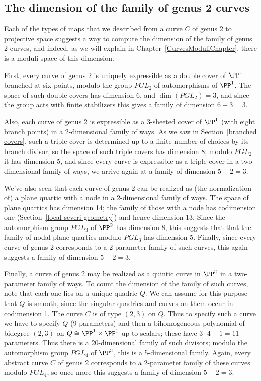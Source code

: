 \subsection{The dimension of the family of genus 2 curves}

Each of the types of maps that we described from a curve $C$ of genus 2 to projective space suggests
a way to compute the dimension of the family of genus 2 curves, and indeed, as we will explain in Chapter~\ref{CurvesModuliChapter}, there is a moduli space of this dimension.

First,  every curve of genus 2 is uniquely expressible as a double cover of $\PP^1$ branched at six points, modulo the group $PGL_2$ of automorphisms of $\PP^1$. The space of such double covers has dimension 6, and $\dim(PGL_2) = 3$, and since the group acts with finite stabilizers this gives a family of dimension $6-3 = 3$.

Also, each curve  of genus 2 is expressible as a 3-sheeted cover of $\PP^1$ (with eight branch points) in a 2-dimensional family of ways. As we saw in Section~\ref{branched covers}, such a triple cover is determined up to a finite number of choices by its branch divisor, so the space of such triple covers has dimension 8; modulo $PGL_2$ it has dimension 5, and since every curve is expressible as a triple cover in a two-dimensional family of ways, we arrive again at a family of dimension $ 5-2 = 3$.

We've also seen that each curve of genus 2 can be realized as (the normalization of) a plane quartic  with a node in a 2-dimensional family of ways. The space of plane quartics has dimension 14; the family of those with a node has codimension one (Section~\ref{local severi geometry}) and hence dimension 13. Since  the automorphism group $PGL_3$ of $\PP^2$ has dimension 8, this suggests that that the family of nodal plane quartics modulo $PGL_3$ has dimension 5. Finally, since every curve of genus 2 corresponds to a 2-parameter family of such curves, this again suggests a family of dimension $ 5-2=3$.

Finally, a curve of genus 2 may be realized as a quintic curve in $\PP^3$ in a two-parameter family of ways. To count the dimension of the family of such curves, note that each one lies on a unique quadric $Q$. We can assume for this purpose that $Q$ is smooth, since the singular quadrics and curves on them occur in codimension 1. The curve $C$ is of type $(2,3)$ on $Q$. Thus to specify such a curve we have to specify $Q$ (9 parameters) and then a bihomogeneous polynomial of bidegree $(2,3)$ on $Q \cong \PP^1 \times \PP^1$ up to scalars; these have $3\cdot 4 - 1 = 11$ parameters. Thus there is a 20-dimensional family of such divisors; modulo the automorphism group $PGL_4$ of $\PP^3$, this is a 5-dimensional family. Again, every abstract curve $C$ of genus 2 corresponds to a 2-parameter family of these curves modulo $PGL_4$, so once more this suggests a family of dimension $ 5 - 2 = 3$.

